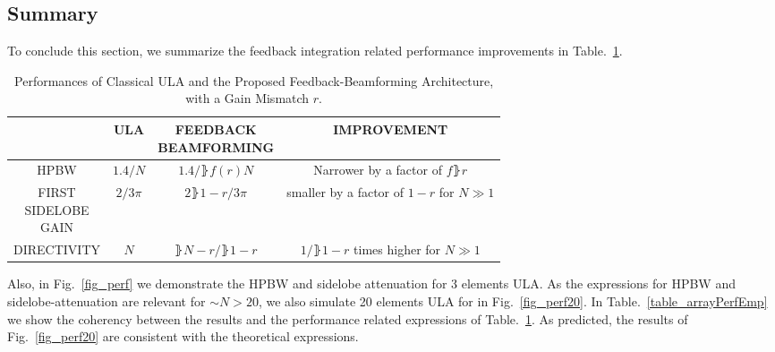 \subsection{Summary}
To conclude this section, we summarize the feedback integration related performance improvements in Table.~\ref{table_arrayPerformance}.
\begin{table}[h!]
    \caption{Performances of Classical ULA and the Proposed Feedback-Beamforming Architecture, with a Gain Mismatch $r$.}
    \centering
    {
        \begin{tabular}{||c c c c||}
            \hline
            & ULA & \thead{FEEDBACK\\BEAMFORMING} & IMPROVEMENT \\ [0.5ex] 
            \hline\hline
            HPBW & $ 1.4/N$ & $1.4/\rBrace{f(r)N}$ & Narrower by a factor of $f\rBrace{r}$\\ 
            \thead{FIRST\\SIDELOBE\\GAIN} & $2/3\pi$ & $2\rBrace{1-r}/3\pi$ & \thead{smaller by a factor of $1-r$\\for $N\gg{}1$} \\
            DIRECTIVITY & $N$ & $\rBrace{N-r}/\rBrace{1-r}$ & \thead{$1/\rBrace{1-r}$ times higher \\ for $N\gg{}1$}\\
            [1ex] 
            \hline
         \end{tabular}
     }
    \label{table_arrayPerformance}
\end{table}
Also, in Fig.~\ref{fig_perf} we demonstrate the HPBW and sidelobe attenuation for 3 elements ULA.
As the expressions for HPBW and sidelobe-attenuation are relevant for $\sim{}N>20$, we also simulate 20 elements ULA for in Fig.~\ref{fig_perf20}. 
In Table.~\ref{table_arrayPerfEmp} we show the coherency between the results and the performance related expressions of Table.~\ref{table_arrayPerformance}.
As predicted, the results of Fig.~\ref{fig_perf20} are consistent with the theoretical expressions.
